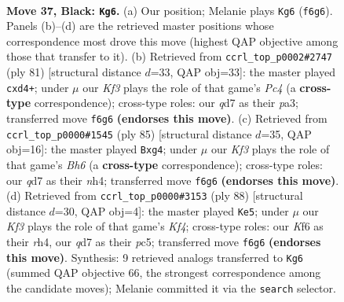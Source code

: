 \documentclass[11pt]{article}
\begin{document}
\clearpage

\begin{figure}[p]\centering
\begin{subfigure}{0.46\textwidth}\centering
\resizebox{\linewidth}{!}{%
\newchessgame
\chessboard[
  setfen={8/2pQRp2/5k1p/8/5P2/8/6P1/R5K1 b - - 1 37},
  showmover=false,
  pgfstyle=straightmove, color=movearrow, markmove={f6-g6}
]}
\caption{}
\end{subfigure}\hfill
\begin{subfigure}{0.46\textwidth}\centering
\resizebox{\linewidth}{!}{%
\newchessgame
\chessboard[
  setfen={8/p7/7p/2p1k3/3R2PP/P3K3/8/8 b - - 0 41},
  showmover=false,
  pgfstyle=straightmove, color=movearrow, markmove={c5-d4}
]}
\caption{}
\end{subfigure}
\\[4pt]
\begin{subfigure}{0.46\textwidth}\centering
\resizebox{\linewidth}{!}{%
\newchessgame
\chessboard[
  setfen={8/5k2/5P2/p7/1p4RN/1P5b/2PK4/8 b - - 0 43},
  showmover=false,
  pgfstyle=straightmove, color=movearrow, markmove={h3-g4}
]}
\caption{}
\end{subfigure}\hfill
\begin{subfigure}{0.46\textwidth}\centering
\resizebox{\linewidth}{!}{%
\newchessgame
\chessboard[
  setfen={8/4k2p/8/2p2p2/2P2K1r/7P/R4P2/8 w - - 1 45},
  showmover=false,
  pgfstyle=straightmove, color=movearrow, markmove={f4-e5}
]}
\caption{}
\end{subfigure}
\caption{\textbf{Move 37, Black: \texttt{Kg6}.} (a) Our position; Melanie plays \texttt{Kg6} (\texttt{f6g6}). Panels (b)--(d) are the retrieved master positions whose correspondence most drove this move (highest QAP objective among those that transfer to it). (b) Retrieved from \texttt{ccrl\_top\_p0002\#2747} (ply 81) [structural distance $d$=33, QAP obj=33]: the master played \texttt{cxd4+}; under $\mu$ our \emph{Kf3} plays the role of that game's \emph{Pc4} (a \textbf{cross-type} correspondence); cross-type roles: our \emph{q}d7 as their \emph{p}a3; transferred move \texttt{f6g6} \textbf{(endorses this move)}. (c) Retrieved from \texttt{ccrl\_top\_p0000\#1545} (ply 85) [structural distance $d$=35, QAP obj=16]: the master played \texttt{Bxg4}; under $\mu$ our \emph{Kf3} plays the role of that game's \emph{Bh6} (a \textbf{cross-type} correspondence); cross-type roles: our \emph{q}d7 as their \emph{n}h4; transferred move \texttt{f6g6} \textbf{(endorses this move)}. (d) Retrieved from \texttt{ccrl\_top\_p0000\#3153} (ply 88) [structural distance $d$=30, QAP obj=4]: the master played \texttt{Ke5}; under $\mu$ our \emph{Kf3} plays the role of that game's \emph{Kf4}; cross-type roles: our \emph{K}f6 as their \emph{r}h4, our \emph{q}d7 as their \emph{p}c5; transferred move \texttt{f6g6} \textbf{(endorses this move)}. Synthesis: 9 retrieved analogs transferred to \texttt{Kg6} (summed QAP objective 66, the strongest correspondence among the candidate moves); Melanie committed it via the \texttt{search} selector.}
\label{fig:thought-m73}
\end{figure}
\end{document}
